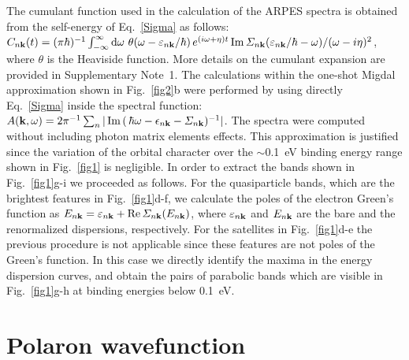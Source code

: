 \documentclass[12pt]{nature}
\def\bk{{\bf k}}
\def\ve{\varepsilon}
\begin{document}
The cumulant function used in the calculation of the ARPES spectra is obtained from the self-energy of 
Eq.~\eqref{Sigma} as follows\cite{Aryasetiawan1996}:
$ C_{n\bk}(t)=(\pi\hbar)^{-1}\int_{-\infty}^{\infty}{\rm d}\omega \,
 \,\theta(\omega-\ve_{n\bk}/\hbar)\, e^{(i\omega+\eta)t}\,
 {\rm Im}\,\varSigma_{n\bk}(\ve_{n\bk}/\hbar-\omega)/(\omega-i\eta)^2
$, where $\theta$ is the Heaviside function. More details on the cumulant expansion are provided in 
Supplementary Note~1. The calculations within the one-shot Migdal approximation shown in Fig.~\ref{fig2}b 
were performed by using directly Eq.~\eqref{Sigma} inside the spectral function\cite{GiustinoRMP}: 
$ A(\bk,\omega)= 2\pi^{-1}\sum_n |\,{\rm Im}\,(\,\hbar\omega-\epsilon_{n\bk}-\varSigma_{n\bk})^{-1}| $.
The spectra were computed without including photon matrix elements effects\cite{Damascelli2003}. 
This approximation is justified since the variation of the orbital character over the $\sim$0.1~eV 
binding energy range shown in Fig.~\ref{fig1} is negligible\cite{Damascelli2003}. 
In order to extract the bands shown in Fig.~\ref{fig1}g-i we proceeded as follows. For the 
quasiparticle bands, which are the brightest features in Fig.~\ref{fig1}d-f, we calculate the poles 
of the electron Green's function as $E_{n\bk}=\ve_{n\bk}+{\rm Re}\,\varSigma_{n\bk}(E_{n\bk})$, where 
$\ve_{n\bk}$ and $E_{n\bk}$ are the bare and the renormalized dispersions, respectively. For the 
satellites in Fig.~\ref{fig1}d-e the previous procedure is not applicable since these features are 
not poles of the Green's function. In this case we directly identify the maxima in the energy 
dispersion curves\cite{Damascelli2003}, and obtain the pairs of parabolic bands which are visible 
in Fig.~\ref{fig1}g-h at binding energies below 0.1~eV. 

\section*{\textsf{\small Polaron wavefunction}} \vspace*{-10pt}
\end{document}
